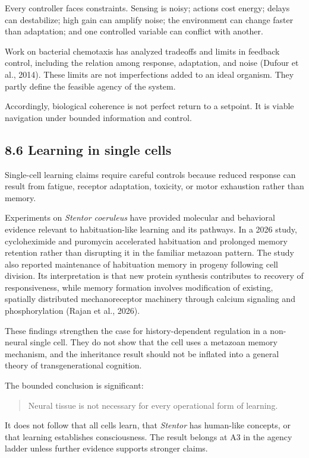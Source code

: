 \documentclass[
  11pt,
]{article}
\begin{document}
Every controller faces constraints. Sensing is noisy; actions cost
energy; delays can destabilize; high gain can amplify noise; the
environment can change faster than adaptation; and one controlled
variable can conflict with another.

Work on bacterial chemotaxis has analyzed tradeoffs and limits in
feedback control, including the relation among response, adaptation, and
noise (Dufour et al., 2014). These limits are not imperfections added to
an ideal organism. They partly define the feasible agency of the system.

Accordingly, biological coherence is not perfect return to a setpoint.
It is viable navigation under bounded information and control.

\subsection{8.6 Learning in single
cells}\label{learning-in-single-cells}

Single-cell learning claims require careful controls because reduced
response can result from fatigue, receptor adaptation, toxicity, or
motor exhaustion rather than memory.

Experiments on \emph{Stentor coeruleus} have provided molecular and
behavioral evidence relevant to habituation-like learning and its
pathways. In a 2026 study, cycloheximide and puromycin accelerated
habituation and prolonged memory retention rather than disrupting it in
the familiar metazoan pattern. The study also reported maintenance of
habituation memory in progeny following cell division. Its
interpretation is that new protein synthesis contributes to recovery of
responsiveness, while memory formation involves modification of
existing, spatially distributed mechanoreceptor machinery through
calcium signaling and phosphorylation (Rajan et al., 2026).

These findings strengthen the case for history-dependent regulation in a
non-neural single cell. They do not show that the cell uses a metazoan
memory mechanism, and the inheritance result should not be inflated into
a general theory of transgenerational cognition.

The bounded conclusion is significant:

\begin{quote}
Neural tissue is not necessary for every operational form of learning.
\end{quote}

It does not follow that all cells learn, that \emph{Stentor} has
human-like concepts, or that learning establishes consciousness. The
result belongs at A3 in the agency ladder unless further evidence
supports stronger claims.
\end{document}
